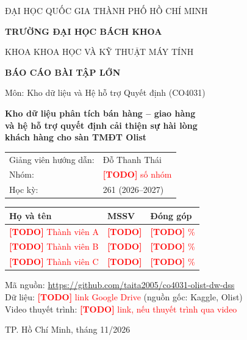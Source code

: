 \documentclass[12pt,a4paper]{report}
\newcommand{\todo}[1]{\textcolor{red}{\textbf{[TODO]} #1}}
\renewcommand{\_}{\oldunderscore\allowbreak}
\begin{document}
\begin{titlepage}
\centering
{\large ĐẠI HỌC QUỐC GIA THÀNH PHỐ HỒ CHÍ MINH\par}
{\large\bfseries TRƯỜNG ĐẠI HỌC BÁCH KHOA\par}
{\large KHOA KHOA HỌC VÀ KỸ THUẬT MÁY TÍNH\par}
\vspace{2cm}
{\Large\bfseries BÁO CÁO BÀI TẬP LỚN\par}
\vspace{0.4cm}
{\large Môn: Kho dữ liệu và Hệ hỗ trợ Quyết định (CO4031)\par}
\vspace{1cm}
{\LARGE\bfseries Kho dữ liệu phân tích bán hàng -- giao hàng\\[0.2em]
và hệ hỗ trợ quyết định cải thiện sự hài lòng\\[0.2em]
khách hàng cho sàn TMĐT Olist\par}
\vspace{1.2cm}
\begin{tabular}{@{}ll@{}}
Giảng viên hướng dẫn: & Đỗ Thanh Thái \\
Nhóm: & \todo{số nhóm} \\
Học kỳ: & 261 (2026--2027) \\
\end{tabular}

\vspace{0.8cm}
\begin{tabular}{@{}lll@{}}
\toprule
\textbf{Họ và tên} & \textbf{MSSV} & \textbf{Đóng góp} \\
\midrule
\todo{Thành viên A} & \todo{} & \todo{\%} \\
\todo{Thành viên B} & \todo{} & \todo{\%} \\
\todo{Thành viên C} & \todo{} & \todo{\%} \\
\bottomrule
\end{tabular}

\vspace{0.8cm}
{\small
Mã nguồn: \url{https://github.com/taita2005/co4031-olist-dw-dss}\\
Dữ liệu: \todo{link Google Drive} (nguồn gốc: Kaggle, Olist)\\
Video thuyết trình: \todo{link, nếu thuyết trình qua video}\par}

\vfill
{\large TP. Hồ Chí Minh, tháng 11/2026\par}
\end{titlepage}
\end{document}
